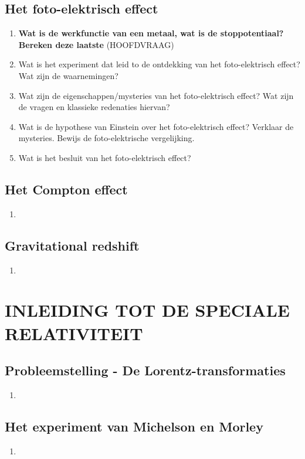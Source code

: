 \documentclass[12pt]{article}
\begin{document}
    \subsection{Het foto-elektrisch effect}
    \begin{enumerate}
        \item \textbf{Wat is de werkfunctie van een metaal, wat is de stoppotentiaal? Bereken deze laatste} (HOOFDVRAAG)
        \item Wat is het experiment dat leid to de ontdekking van het foto-elektrisch effect? Wat zijn de waarnemingen?
        \item Wat zijn de eigenschappen/mysteries van het foto-elektrisch effect? Wat zijn de vragen en klassieke redenaties hiervan?
        \item Wat is de hypothese van Einstein over het foto-elektrisch effect? Verklaar de mysteries. Bewijs de foto-elektrische vergelijking.
        \item Wat is het besluit van het foto-elektrisch effect?
    \end{enumerate}
    \subsection{Het Compton effect}
    \begin{enumerate}
        \item 
    \end{enumerate}
    \subsection{Gravitational redshift}
    \begin{enumerate}
        \item 
    \end{enumerate}



    \section{INLEIDING TOT DE SPECIALE RELATIVITEIT}
    \subsection{Probleemstelling - De Lorentz-transformaties}
    \begin{enumerate}
        \item 
    \end{enumerate}
    \subsection{Het experiment van Michelson en Morley}
    \begin{enumerate}
        \item 
    \end{enumerate}
\end{document}
